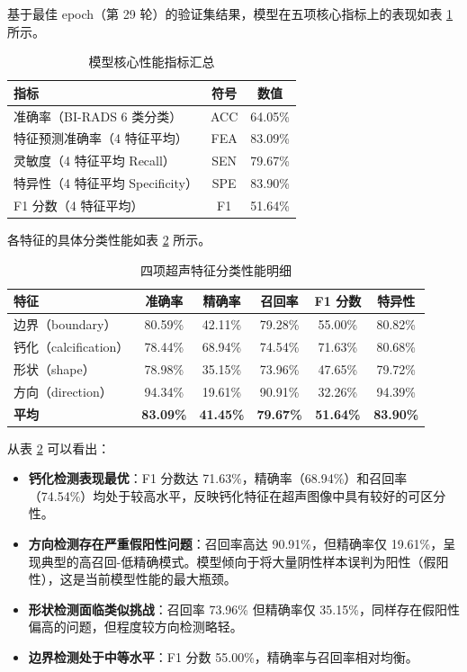 \documentclass[UTF8]{ctexart}
\begin{document}
基于最佳 epoch（第 29 轮）的验证集结果，模型在五项核心指标上的表现如表 \ref{tab:core_metrics} 所示。

\begin{table}[htbp]
\centering
\caption{模型核心性能指标汇总}
\label{tab:core_metrics}
\begin{tabular}{lcc}
\toprule
\textbf{指标} & \textbf{符号} & \textbf{数值} \\
\midrule
准确率（BI-RADS 6 类分类） & ACC & 64.05\% \\
特征预测准确率（4 特征平均） & FEA & 83.09\% \\
灵敏度（4 特征平均 Recall） & SEN & 79.67\% \\
特异性（4 特征平均 Specificity） & SPE & 83.90\% \\
F1 分数（4 特征平均） & F1 & 51.64\% \\
\bottomrule
\end{tabular}
\end{table}

各特征的具体分类性能如表 \ref{tab:feature_metrics} 所示。

\begin{table}[htbp]
\centering
\caption{四项超声特征分类性能明细}
\label{tab:feature_metrics}
\begin{tabular}{lccccc}
\toprule
\textbf{特征} & \textbf{准确率} & \textbf{精确率} & \textbf{召回率} & \textbf{F1 分数} & \textbf{特异性} \\
\midrule
边界（boundary） & 80.59\% & 42.11\% & 79.28\% & 55.00\% & 80.82\% \\
钙化（calcification） & 78.44\% & 68.94\% & 74.54\% & 71.63\% & 80.68\% \\
形状（shape） & 78.98\% & 35.15\% & 73.96\% & 47.65\% & 79.72\% \\
方向（direction） & 94.34\% & 19.61\% & 90.91\% & 32.26\% & 94.39\% \\
\midrule
\textbf{平均} & \textbf{83.09\%} & \textbf{41.45\%} & \textbf{79.67\%} & \textbf{51.64\%} & \textbf{83.90\%} \\
\bottomrule
\end{tabular}
\end{table}

从表 \ref{tab:feature_metrics} 可以看出：
\begin{itemize}
    \item \textbf{钙化检测表现最优}：F1 分数达 71.63\%，精确率（68.94\%）和召回率（74.54\%）均处于较高水平，反映钙化特征在超声图像中具有较好的可区分性。
    \item \textbf{方向检测存在严重假阳性问题}：召回率高达 90.91\%，但精确率仅 19.61\%，呈现典型的高召回-低精确模式。模型倾向于将大量阴性样本误判为阳性（假阳性），这是当前模型性能的最大瓶颈。
    \item \textbf{形状检测面临类似挑战}：召回率 73.96\% 但精确率仅 35.15\%，同样存在假阳性偏高的问题，但程度较方向检测略轻。
    \item \textbf{边界检测处于中等水平}：F1 分数 55.00\%，精确率与召回率相对均衡。
\end{itemize}
\end{document}

